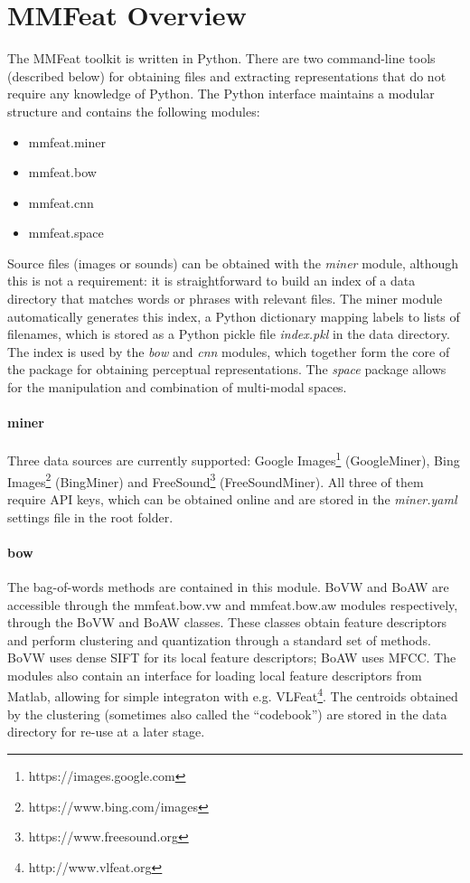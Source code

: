 \documentclass[11pt]{article}
\begin{document}
\section{MMFeat Overview}

The MMFeat toolkit is written in Python. There are two command-line tools (described below) for obtaining files and extracting representations that do not require any knowledge of Python. The Python interface maintains a modular structure and contains the following modules:

\begin{itemize}
\item mmfeat.miner
\vspace{-10pt}
\item mmfeat.bow
\vspace{-10pt}
\item mmfeat.cnn
\vspace{-10pt}
\item mmfeat.space
\end{itemize}

\noindent Source files (images or sounds) can be obtained with the \emph{miner} module, although this is not a requirement: it is straightforward to build an index of a data directory that matches words or phrases with relevant files. The miner module automatically generates this index, a Python dictionary mapping labels to lists of filenames, which is stored as a Python pickle file \emph{index.pkl} in the data directory. The index is used by the \emph{bow} and \emph{cnn} modules, which together form the core of the package for obtaining perceptual representations. The \emph{space} package allows for the manipulation and combination of multi-modal spaces.

\paragraph{miner} Three data sources are currently supported: Google Images\footnote{https://images.google.com} (GoogleMiner), Bing Images\footnote{https://www.bing.com/images} (BingMiner) and FreeSound\footnote{https://www.freesound.org} (FreeSoundMiner). All three of them require API keys, which can be obtained online and are stored in the \emph{miner.yaml} settings file in the root folder.

\paragraph{bow} The bag-of-words methods are contained in this module. BoVW and BoAW are accessible through the mmfeat.bow.vw and mmfeat.bow.aw modules respectively, through the BoVW and BoAW classes. These classes obtain feature descriptors and perform clustering and quantization through a standard set of methods. BoVW uses dense SIFT for its local feature descriptors; BoAW uses MFCC. The modules also contain an interface for loading local feature descriptors from Matlab, allowing for simple integraton with e.g. VLFeat\footnote{http://www.vlfeat.org}. The centroids obtained by the clustering (sometimes also called the ``codebook'') are stored in the data directory for re-use at a later stage.
\end{document}
